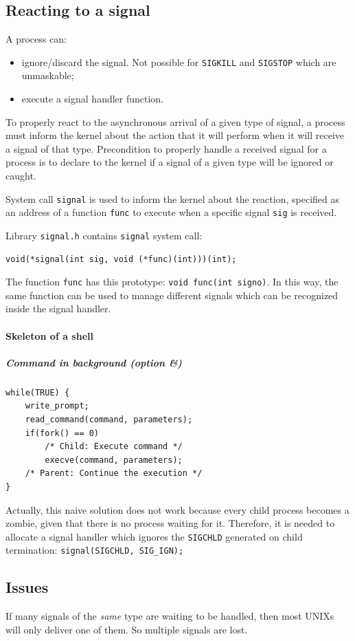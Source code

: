 \subsection{Reacting to a signal}
A process can:
\begin{itemize}
\item ignore/discard the signal. Not possible for \texttt{SIGKILL} and \texttt{SIGSTOP} which are unmaskable;
\item execute a signal handler function.
\end{itemize}
To properly react to the asynchronous arrival of a given type of signal, a process must inform the kernel about the action that it will perform when it will receive a signal of that type. Precondition to properly handle a received signal for a process is to declare to the kernel if a signal of a given type will be ignored or caught.

System call \texttt{signal} is used to inform the kernel about the reaction, specified as an address of a function \texttt{func} to execute when a specific signal \texttt{sig} is received.

Library \texttt{signal.h} contains \texttt{signal} system call:
\begin{verbatim}
void(*signal(int sig, void (*func)(int)))(int);
\end{verbatim}

The function \texttt{func} has this prototype: \texttt{void func(int signo)}. In this way, the same function can be used to manage different signals which can be recognized inside the signal handler.

\paragraph{Skeleton of a shell}
\subparagraph{Command in background (option \&)}
\begin{verbatim}
while(TRUE) {
    write_prompt;
    read_command(command, parameters);
    if(fork() == 0)
        /* Child: Execute command */
        execve(command, parameters);
    /* Parent: Continue the execution */
}
\end{verbatim}
Actually, this naive solution does not work because every child process becomes a zombie, given that there is no process waiting for it. Therefore, it is needed to allocate a signal handler which ignores the \texttt{SIGCHLD} generated on child termination: \texttt{signal(SIGCHLD, SIG\_IGN);}

\subsection{Issues}
If many signals of the \emph{same} type are waiting to be handled, then most UNIXs will only deliver one of them. So multiple signals are lost.

